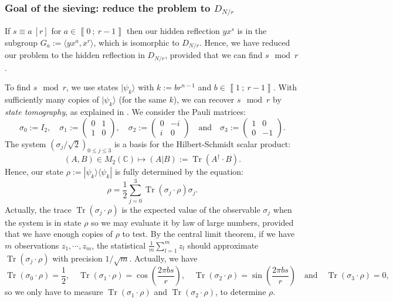 \documentclass[a4paper,10pt]{report}
\theoremstyle{definition}
\theoremstyle{plain}
\theoremstyle{definition}
\newcommand{\C}{\mathbb{C}}
\renewcommand{\i}[2]{\left\llbracket #1~;~#2\right\rrbracket}
\renewcommand{\(}{\left(}
\renewcommand{\)}{\right)}
\DeclareMathOperator{\Tr}{Tr}
\begin{document}
\subsubsection{Goal of the sieving: reduce the problem to $D_{N/r}$}\label{paragraph 13}

If $s\equiv a \ [r]$ for $a\in\i{0}{r-1}$ then our hidden reflection $yx^s$ is in the subgroup $G_a:=\langle yx^a,x^r\rangle$, which is isomorphic to $D_{N/r}$. Hence, we have reduced our problem to the hidden reflection in $D_{N/r}$, provided that we can find $s \mod r$.

To find $s \mod r$, we use states $|\psi_k\rangle$ with $k:=br^{n-1}$ and $b\in\i{1}{r-1}$. With sufficiently many copies of $|\psi_k\rangle$ (for the same $k$), we can recover $s \mod r$ by \emph{state tomography}, as explained in \cite[§ 8.4.2, p.389]{NielsanChaung}. We consider the Pauli matrices:
\[\sigma_0:=I_2, \quad \sigma_1:=\(\begin{array}{cc}
0 & 1\\
1 & 0
\end{array}\), \quad \sigma_2:=\(\begin{array}{cc}
0 & -i\\
i & 0
\end{array}\) \quad \mbox{and} \quad \sigma_3:=\(\begin{array}{cc}
1 & 0\\
0 & -1
\end{array}\).\]
The system $(\sigma_j/\sqrt{2})_{0\leq j\leq 3}$ is a basis for the Hilbert-Schmidt scalar product:
\[(A,B)\in M_2(\C)\longmapsto (A|B):=\Tr(A^{\dag}\cdot B).\]
Hence, our state $\rho:=|\psi_k\rangle\langle\psi_k|$ is fully determined by the equation: 
\[\rho=\frac{1}{2}\sum_{j=0}^3\Tr(\sigma_j\cdot\rho)\sigma_j.\]
Actually, the trace $\Tr(\sigma_j\cdot\rho)$ is the expected value of the observable $\sigma_j$ when the system is in state $\rho$ so we may evaluate it by law of large numbers,  provided that we have enough copies of $\rho$ to test. By the central limit theorem, if we have $m$ observations $z_1, \cdots, z_m$, the statistical $\frac{1}{m}\sum_{l=1}^m z_l$ should approximate $\Tr(\sigma_j\cdot\rho)$ with precision $1/\sqrt{m}$.  Actually, we have
\[\Tr(\sigma_0\cdot\rho)=\frac{1}{2}, \quad \Tr(\sigma_1\cdot\rho)=\cos\(\frac{2\pi bs}{r}\), \quad \Tr(\sigma_2\cdot\rho)=\sin\(\frac{2\pi bs}{r}\) \quad \mbox{and} \quad \Tr(\sigma_3\cdot\rho)=0,\]
so we only have to measure $\Tr(\sigma_1\cdot\rho)$ and $\Tr(\sigma_2\cdot\rho)$, to determine $\rho$.
\end{document}
